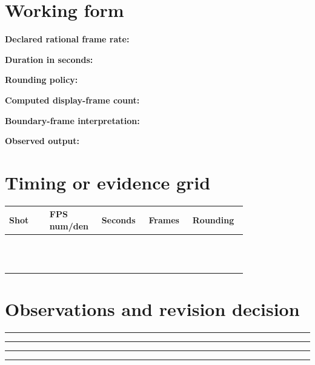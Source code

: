 \documentclass[10pt,letterpaper]{article}
\begin{document}
\section{Working form}
\noindent\textbf{Declared rational frame rate:}\quad\hrulefill\par\vspace{10pt}
\noindent\textbf{Duration in seconds:}\quad\hrulefill\par\vspace{10pt}
\noindent\textbf{Rounding policy:}\quad\hrulefill\par\vspace{10pt}
\noindent\textbf{Computed display-frame count:}\quad\hrulefill\par\vspace{10pt}
\noindent\textbf{Boundary-frame interpretation:}\quad\hrulefill\par\vspace{10pt}
\noindent\textbf{Observed output:}\quad\hrulefill\par\vspace{10pt}\section{Timing or evidence grid}
\begin{longtable}{|p{0.156\linewidth}|p{0.156\linewidth}|p{0.156\linewidth}|p{0.156\linewidth}|p{0.156\linewidth}|}
\hline
\textbf{Shot} & \textbf{FPS num/den} & \textbf{Seconds} & \textbf{Frames} & \textbf{Rounding}\\\hline
\endhead
\rule{0pt}{20pt} &  &  &  & \\\hline
\rule{0pt}{20pt} &  &  &  & \\\hline
\rule{0pt}{20pt} &  &  &  & \\\hline
\rule{0pt}{20pt} &  &  &  & \\\hline
\rule{0pt}{20pt} &  &  &  & \\\hline
\rule{0pt}{20pt} &  &  &  & \\\hline
\rule{0pt}{20pt} &  &  &  & \\\hline
\rule{0pt}{20pt} &  &  &  & \\\hline
\rule{0pt}{20pt} &  &  &  & \\\hline
\rule{0pt}{20pt} &  &  &  & \\\hline
\rule{0pt}{20pt} &  &  &  & \\\hline
\rule{0pt}{20pt} &  &  &  & \\\hline
\end{longtable}
\section{Observations and revision decision}
\noindent\rule{\linewidth}{0.4pt}\par\vspace{18pt}\noindent\rule{\linewidth}{0.4pt}\par\vspace{18pt}\noindent\rule{\linewidth}{0.4pt}\par\vspace{18pt}\noindent\rule{\linewidth}{0.4pt}\par\vspace{18pt}
\end{document}
